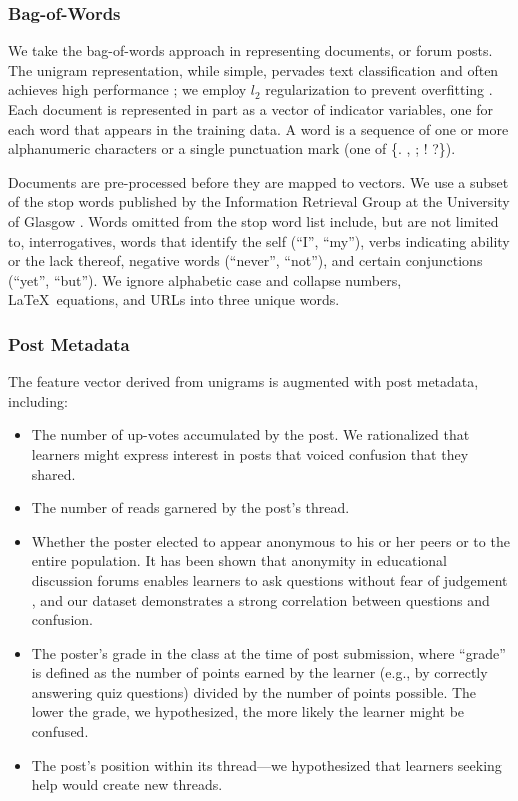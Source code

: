 \documentclass{edm_template}
\newcommand{\squishlist}{
 \begin{list}{$\bullet$}
 {
  \setlength{\itemsep}{0pt}
  \setlength{\parsep}{3pt}
  \setlength{\topsep}{3pt}
  \setlength{\partopsep}{0pt}
  \setlength{\leftmargin}{1.5em}
  \setlength{\labelwidth}{1em}
  \setlength{\labelsep}{0.5em} } }
\newcommand{\squishend}{
  \end{list}  }
\begin{document}
\subsubsection{Bag-of-Words}
We take the bag-of-words approach in representing documents, or forum posts. The unigram representation, while simple, pervades text classification and often achieves high performance \cite{boulis2005text}; we employ $l_{2}$ regularization to prevent overfitting \cite{Ng:2004:FSL:1015330.1015435}. Each document is represented in part as a vector of indicator variables, one for each word that appears in the training data. A word is a sequence of one or more alphanumeric characters or a single punctuation mark (one of \{. , ; ! ?\}). 

Documents are pre-processed before they are mapped to vectors. We use a subset of the stop words published by the Information Retrieval Group at the University of Glasgow \cite{glasgow}. Words omitted from the stop word list include, but are not limited to, interrogatives, words that identify the self (``I'', ``my''), verbs indicating ability or the lack thereof, negative words (``never'', ``not''), and certain conjunctions (``yet'', ``but''). We ignore alphabetic case and collapse numbers, \LaTeX\ equations, and URLs into three unique words.


\subsubsection{Post Metadata}
The feature vector derived from unigrams is augmented with post metadata, including: 
\vspace{-13pt}
\begin{itemize}
\setlength\itemsep{0.05em}
       \item The number of up-votes accumulated by the post. We rationalized that learners might express interest in posts that voiced confusion that they shared. 
       \item The number of reads garnered by the post's thread.
       \item Whether the poster elected to appear anonymous to his or her peers or to the entire population. It has been shown that anonymity in educational discussion forums enables learners to ask questions without fear of judgement \cite{freeman2004student}, and our dataset demonstrates a strong correlation between questions and confusion.
       \item The poster's grade in the class at the time of post submission, where ``grade'' is defined as the number of points earned by the learner (e.g., by correctly answering quiz questions) divided by the number of points possible. The lower the grade, we hypothesized, the more likely the learner might be confused.
       \item The post's position within its thread---we hypothesized that learners seeking help would create new threads.
\end{itemize}
\end{document}
